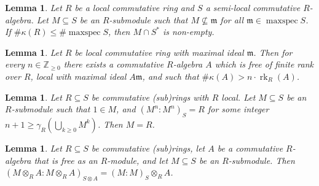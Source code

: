 \documentclass{amsart}
\theoremstyle{plain}
\newtheorem{lemma}[theorem]{Lemma}
\theoremstyle{definition}
\DeclareMathOperator{\rk}{rk}
\DeclareMathOperator{\maxspec}{maxspec}
\newcommand{\tensor}{\otimes}
\newcommand{\Z}{\ensuremath{\mathbb{Z}}}
\newcommand{\fm}{\ensuremath{\mathfrak{m}}}
\begin{document}
\begin{lemma}\label{lem:cardinality_unit}
Let \(R\) be a local commutative ring and \(S\) a semi-local commutative \(R\)-algebra. 
Let \(M\subseteq S\) be an \(R\)-submodule such that \(M\not\subseteq \fm\) for all \(\fm\in\maxspec S\). If \(\#\kappa(R)\leq\#\maxspec S\), then \(M\cap S^*\) is non-empty.
\end{lemma}

\begin{lemma}\label{lem:large_extension}
Let \(R\) be local commutative ring with maximal ideal \(\fm\). 
Then for every \(n\in\Z_{\geq 0}\) there exists a commutative \(R\)-algebra \(A\) which is free of finite rank over \(R\), local with maximal ideal \(A\fm\), and such that \(\#\kappa(A)>n\cdot\rk_R(A)\).
\end{lemma}

\begin{lemma}\label{lem:module_has_one}
Let \(R\subseteq S\) be commutative (sub)rings with \(R\) local. 
Let \(M\subseteq S\) be an \(R\)-submodule such that \(1\in M\), and \((M^n:M^n)_S=R\) for some integer \(n+1\geq \gamma_R(\bigcup_{k\geq 0} M^k)\). 
Then \(M=R\).
\end{lemma}

\begin{lemma}\label{lem:tensor_division}
Let \(R\subseteq S\) be commutative (sub)rings, let \(A\) be a commutative \(R\)-algebra that is free as an \(R\)-module, and let \(M\subseteq S\) be an \(R\)-submodule. 
Then \((M\tensor_R A : M\tensor_R A)_{S\tensor A} = (M:M)_S \tensor_R A\). %
\end{lemma}
\end{document}
